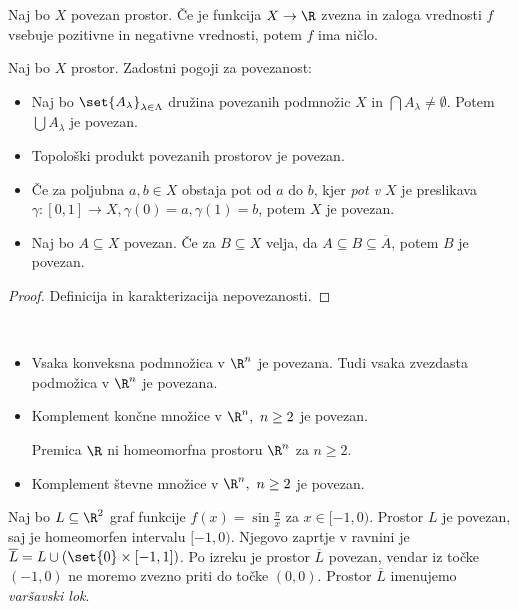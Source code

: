 \begin{posledica}
    Naj bo $X$ povezan prostor. Če je funkcija $X \to \R$ zvezna in zaloga vrednosti $f$ vsebuje pozitivne in negativne vrednosti, potem $f$ ima ničlo.
\end{posledica}

\begin{izrek}
    Naj bo $X$ prostor. Zadostni pogoji za povezanost:
    \begin{itemize}
        \item Naj bo $\set{A_\lambda}_{\lambda \in \Lambda}$ družina povezanih podmnožic $X$ in $\bigcap A_\lambda \neq \emptyset$. Potem $\bigcup A_\lambda$ je povezan.
        \item Topološki produkt povezanih prostorov je povezan.
        \item Če za poljubna $a,b \in X$ obstaja pot od $a$ do $b$, kjer \emph{pot v $X$} je preslikava $\gamma: [0,1] \to X, \gamma(0) = a, \gamma(1) = b$, potem $X$ je povezan.
        \item Naj bo $A \subseteq X$ povezan. Če za $B \subseteq X$ velja, da $A \subseteq B \subseteq \overline{A}$, potem $B$ je povezan.
    \end{itemize}
\end{izrek}

\begin{proof}
    Definicija in karakterizacija nepovezanosti.
\end{proof}

\begin{primer}
    \ 
    \begin{itemize}
        \item Vsaka konveksna podmnožica v $\R^n$ je povezana. Tudi vsaka zvezdasta podmožica v $\R^n$ je povezana.
        \item Komplement končne množice v $\R^n, \ n \geq 2$ je povezan.
        \begin{posledica}
            Premica $\R$ ni homeomorfna prostoru $\R^n$ za $n \geq 2$.
        \end{posledica}
        \item Komplement števne množice v $\R^n, \ n \geq 2$ je povezan.
    \end{itemize}
\end{primer}

\begin{primer}
    Naj bo $L \subseteq \R^2$ graf funkcije $f(x) = \sin \frac{\pi}{x}$ za $x \in [-1,0)$. Prostor $L$ je povezan, saj je homeomorfen intervalu $[-1,0)$. Njegovo zaprtje v ravnini je $\overline{L} = L \cup (\set{0} \times [-1,1])$. Po izreku je prostor $\overline{L}$ povezan, vendar iz točke $(-1,0)$ ne moremo zvezno priti do točke $(0,0)$. Prostor $\overline{L}$ imenujemo \emph{varšavski lok}.
\end{primer}

